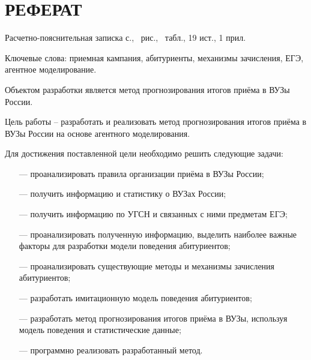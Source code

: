 \section*{РЕФЕРАТ}

Расчетно-пояснительная записка \pageref{LastPage} с., \totalfigures\ рис., \totaltables\ табл., 19 ист., 1 прил.

Ключевые слова: приемная кампания, абитуриенты, механизмы зачисления, ЕГЭ, агентное моделирование.


Объектом разработки является метод прогнозирования итогов приёма в ВУЗы России.

Цель работы – разработать и реализовать метод прогнозирования итогов приёма в ВУЗы России на основе агентного моделирования.

Для достижения поставленной цели необходимо решить следующие задачи:

\begin{itemize}[leftmargin=1.6\parindent]
	\item[---] проанализировать правила организации приёма в ВУЗы России;
	\item[---] получить информацию и статистику о ВУЗах России;
	\item[---] получить информацию по УГСН и связанных с ними предметам ЕГЭ;
	\item[---] проанализировать полученную информацию, выделить наиболее важные факторы для разработки модели поведения абитуриентов;
	\item[---] проанализировать существующие методы и механизмы зачисления абитуриентов;
	\item[---] разработать имитационную модель поведения абитуриентов;
	\item[---] разработать метод прогнозирования итогов приёма в ВУЗы, используя модель поведения и статистические данные;
	\item[---] программно реализовать разработанный метод.
\end{itemize}

\pagebreak